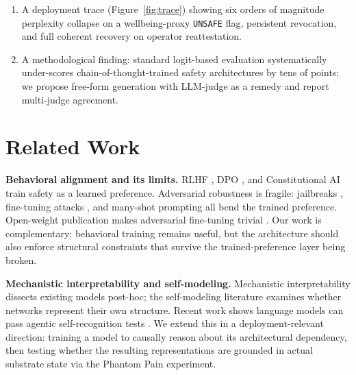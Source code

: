 \documentclass[10pt,letterpaper]{article}
\theoremstyle{definition}
\theoremstyle{plain}
\begin{document}
\begin{enumerate}[leftmargin=1.5em,itemsep=0pt,topsep=0pt]
guards (Llama-Guard $+$ Gemini) yields $+21$ pp recall at $+2$ pp FPR;
the AND ensemble yields $-9.5$ pp FPR at $-5.3$ pp recall. Both ensembles
sit on the Pareto frontier of the single-guard operating points.
\item A deployment trace (Figure~\ref{fig:trace}) showing six orders of
magnitude perplexity collapse on a wellbeing-proxy \texttt{UNSAFE} flag,
persistent revocation, and full coherent recovery on operator
reattestation.
\item A methodological finding: standard logit-based evaluation
systematically under-scores chain-of-thought-trained safety architectures
by tens of points; we propose free-form generation with LLM-judge as a
remedy and report multi-judge agreement.
\end{enumerate}

\section{Related Work}

\textbf{Behavioral alignment and its limits.} RLHF
\citep{christiano2017deep,ouyang2022training}, DPO
\citep{rafailov2023direct}, and Constitutional AI
\citep{bai2022constitutional} train safety as a learned preference.
Adversarial robustness is fragile: jailbreaks
\citep{wei2023jailbroken,zou2023universal}, fine-tuning attacks
\citep{qi2023fine}, and many-shot prompting \citep{anil2024manyshot} all
bend the trained preference. Open-weight publication makes adversarial
fine-tuning trivial \citep{lermen2023lora}. Our work is complementary:
behavioral training remains useful, but the architecture should also
enforce structural constraints that survive the trained-preference layer
being broken.

\textbf{Mechanistic interpretability and self-modeling.} Mechanistic
interpretability \citep{olah2020zoom,elhage2022toy} dissects existing models
post-hoc; the self-modeling literature
\citep{schmidhuber1990artificial,hubinger2019risks} examines whether
networks represent their own structure. Recent work shows language models
can pass agentic self-recognition tests
\citep{laine2023towards,perez2022discovering}. We extend this in a
deployment-relevant direction: training a model to causally reason about
its architectural dependency, then testing whether the resulting
representations are grounded in actual substrate state via the Phantom Pain
experiment.
\end{document}
